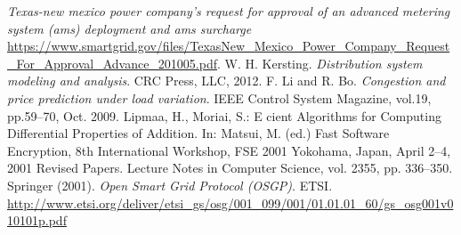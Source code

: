 \documentclass[11pt,oneside]{book}
\begin{document}
\begin{thebibliography}{99}
 \emph{Texas-new mexico power company’s request for approval of an advanced metering system (ams) deployment and ams surcharge} \url{https://www.smartgrid.gov/files/TexasNew_Mexico_Power_Company_Request_For_Approval_Advance_201005.pdf}.
 W. H. Kersting. \emph{Distribution system modeling and analysis}. CRC Press, LLC, 2012.
 F. Li and R. Bo. \emph{Congestion and price prediction under load variation}. IEEE Control System Magazine, vol.19, pp.59–70, Oct. 2009.
 Lipmaa, H., Moriai, S.: E cient Algorithms for Computing Differential Properties of Addition. In: Matsui, M. (ed.) Fast Software Encryption, 8th International Workshop, FSE 2001 Yokohama, Japan, April 2–4, 2001 Revised Papers. Lecture Notes in Computer Science, vol. 2355, pp. 336–350. Springer (2001).
 \emph{Open Smart Grid Protocol (OSGP)}. ETSI. \url{http://www.etsi.org/deliver/etsi_gs/osg/001_099/001/01.01.01_60/gs_osg001v010101p.pdf}
\end{thebibliography}
\end{document}

